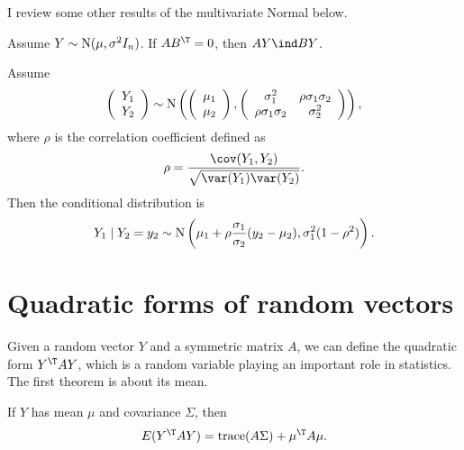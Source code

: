 I review some other results of the multivariate Normal below. 
 
\begin{proposition}
Assume $Y\sim\textup{N}(\mu,\sigma^{2}I_{n})$. If $AB^{\T}=0$, then
$AY\ind BY$.
\end{proposition}
%
%
\begin{proposition}
Assume %
\[
\left(\begin{array}{c}
Y_{1}\\
Y_{2}
\end{array}\right)\sim\textup{N}\left(\left(\begin{array}{c}
\mu_{1}\\
\mu_{2}
\end{array}\right),\left(\begin{array}{cc}
\sigma_{1}^{2} & \rho\sigma_{1}\sigma_{2}\\
\rho\sigma_{1}\sigma_{2} & \sigma_{2}^{2}
\end{array}\right)\right),
\]
where $\rho$ is the correlation coefficient defined as
\[
\rho=\frac{\cov(Y_{1},Y_{2})}{\sqrt{\var(Y_{1})\var(Y_{2})}}.
\]
Then the conditional distribution is
\[
Y_{1}\mid Y_{2}=y_{2}\sim\textup{N}\left(\mu_{1}+\rho\frac{\sigma_{1}}{\sigma_{2}}(y_{2}-\mu_{2}),\sigma_{1}^{2}(1-\rho^{2})\right).
\]
\end{proposition}
%


\section{Quadratic forms of random vectors}

Given a random vector $Y$ and a symmetric matrix $A$, we can define
the quadratic form $Y^{\T}AY$, which is a random variable playing
an important role in statistics. The first theorem is about its mean.

\begin{theorem}\label{thm::mean-quadratic-form}
If $Y$ has mean $\mu$ and covariance $\Sigma$, then 
\[
E(Y^{\T}AY)=\textup{trace}(A\Sigma)+\mu^{\T}A\mu.
\]
\end{theorem}

